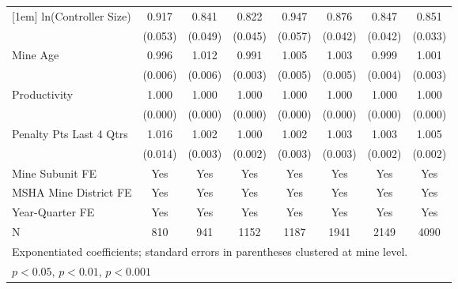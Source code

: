 {\begin{tabular}{l*{7}{c}}
[1em]
ln(Controller Size)      &       0.917         &       0.841\sym{**} &       0.822\sym{***}&       0.947         &       0.876\sym{**} &       0.847\sym{***}&       0.851\sym{***}\\
                         &     (0.053)         &     (0.049)         &     (0.045)         &     (0.057)         &     (0.042)         &     (0.042)         &     (0.033)         \\
[1em]
Mine Age                 &       0.996         &       1.012         &       0.991\sym{**} &       1.005         &       1.003         &       0.999         &       1.001         \\
                         &     (0.006)         &     (0.006)         &     (0.003)         &     (0.005)         &     (0.005)         &     (0.004)         &     (0.003)         \\
[1em]
Productivity             &       1.000         &       1.000         &       1.000\sym{**} &       1.000         &       1.000         &       1.000         &       1.000         \\
                         &     (0.000)         &     (0.000)         &     (0.000)         &     (0.000)         &     (0.000)         &     (0.000)         &     (0.000)         \\
[1em]
Penalty Pts Last 4 Qtrs  &       1.016         &       1.002         &       1.000         &       1.002         &       1.003         &       1.003         &       1.005\sym{*}  \\
                         &     (0.014)         &     (0.003)         &     (0.002)         &     (0.003)         &     (0.003)         &     (0.002)         &     (0.002)         \\
[1em]
Mine Subunit FE          &         Yes         &         Yes         &         Yes         &         Yes         &         Yes         &         Yes         &         Yes         \\
[1em]
MSHA Mine District FE    &         Yes         &         Yes         &         Yes         &         Yes         &         Yes         &         Yes         &         Yes         \\
[1em]
Year-Quarter FE          &         Yes         &         Yes         &         Yes         &         Yes         &         Yes         &         Yes         &         Yes         \\
\hline
N                        &         810         &         941         &        1152         &        1187         &        1941         &        2149         &        4090         \\
\hline\hline
\multicolumn{8}{l}{\footnotesize Exponentiated coefficients; standard errors in parentheses clustered at mine level.}\\
\multicolumn{8}{l}{\footnotesize \sym{*} \(p<0.05\), \sym{**} \(p<0.01\), \sym{***} \(p<0.001\)}\\
\end{tabular}
}
